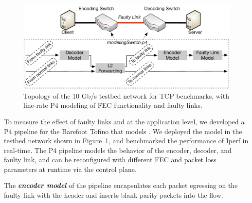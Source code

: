 



\begin{figure}
  \centering
  \includegraphics[width=0.4\paperwidth]{figures/lineRateModel.pdf}
  \caption{\label{fig:p4ModelTopo} Topology of the 10 Gb/s testbed 
  network for TCP benchmarks, with line-rate P4 modeling of FEC functionality and faulty links.}
\end{figure}

To measure the effect of faulty links and \OurSys at the application level, we
developed a P4 pipeline for the Barefoot Tofino that models \OurSys. We
deployed the model in the testbed network shown in
Figure~\ref{fig:p4ModelTopo}, and benchmarked the performance of 
Iperf in real-time. The P4 pipeline models the behavior of the encoder, 
decoder, and faulty link, and can be reconfigured with different FEC and 
packet loss parameters at runtime via the control plane. 

The \textbf{\em encoder model} of the pipeline encapsulates each packet egressing on
the faulty link with the \OurSys header and inserts blank  parity packets into
the flow.

